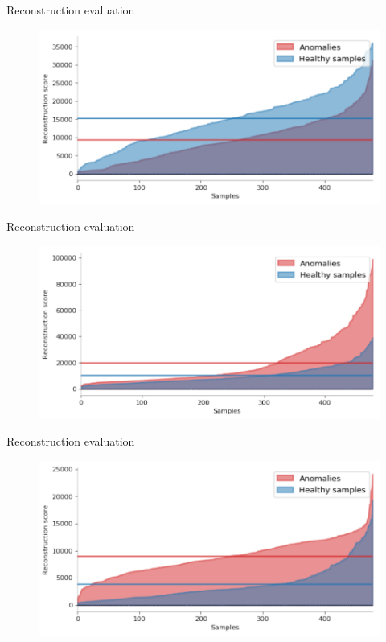\documentclass[15pt]{beamer} %
\begin{document}
\begin{frame}{Reconstruction evaluation}
 \begin{figure}
   \centering
   \includegraphics[width=.85\textwidth]{rec_gmvae_eval}
  \end{figure}
\end{frame}

\begin{frame}{Reconstruction evaluation}
 \begin{figure}
   \centering
   \includegraphics[width=.85\textwidth]{rec_svae_eval}
  \end{figure}
\end{frame}

\begin{frame}{Reconstruction evaluation}
 \begin{figure}
   \centering
   \includegraphics[width=.85\textwidth]{rec_anogan_eval}
  \end{figure}
\end{frame}
\end{document}
